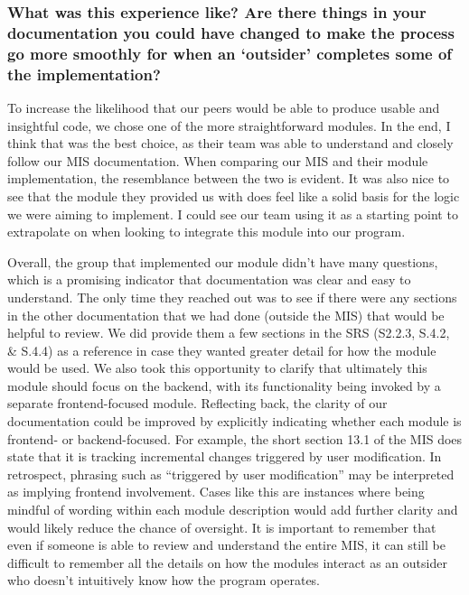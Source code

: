 \documentclass[12pt, titlepage]{article}
\begin{document}
\subsubsection*{What was this experience like? Are there things in your documentation you could have changed to make the process go more smoothly for when an ‘outsider’ completes some of the implementation?} 

To increase the likelihood that our peers would be able to produce usable and insightful code, we chose one of the more straightforward modules. In the end, I think that was the best choice, as their team was able to understand and closely follow our MIS documentation. When comparing our MIS and their module implementation, the resemblance between the two is evident. It was also nice to see that the module they provided us with does feel like a solid basis for the logic we were aiming to implement. I could see our team using it as a starting point to extrapolate on when looking to integrate this module into our program. 

Overall, the group that implemented our module didn’t have many questions, which is a promising indicator that documentation was clear and easy to understand. The only time they reached out was to see if there were any sections in the other documentation that we had done (outside the MIS) that would be helpful to review. We did provide them a few sections in the SRS (S2.2.3, S.4.2, \& S.4.4) as a reference in case they wanted greater detail for how the module would be used. We also took this opportunity to clarify that ultimately this module should focus on the backend, with its functionality being invoked by a separate frontend-focused module. Reflecting back, the clarity of our documentation could be improved by explicitly indicating whether each module is frontend- or backend-focused. For example, the short section 13.1 of the MIS does state that it is tracking incremental changes triggered by user modification. In retrospect, phrasing such as “triggered by user modification” may be interpreted as implying frontend involvement. Cases like this are instances where being mindful of wording within each module description would add further clarity and would likely reduce the chance of oversight. It is important to remember that even if someone is able to review and understand the entire MIS, it can still be difficult to remember all the details on how the modules interact as an outsider who doesn’t intuitively know how the program operates. 
\end{document}
